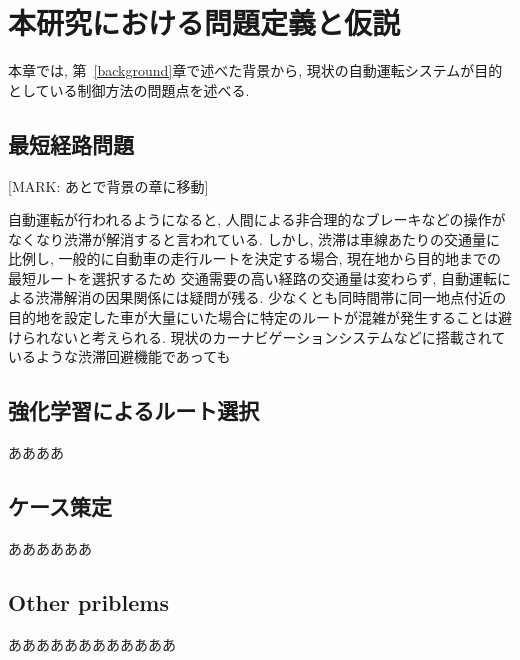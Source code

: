 \chapter{本研究における問題定義と仮説}
\label{issue}

本章では, 第~\ref{background}章で述べた背景から, 現状の自動運転システムが目的としている制御方法の問題点を述べる.

\section{最短経路問題}

[MARK: あとで背景の章に移動]

自動運転が行われるようになると, 人間による非合理的なブレーキなどの操作がなくなり渋滞が解消すると言われている.
しかし, 渋滞は車線あたりの交通量に比例し, 一般的に自動車の走行ルートを決定する場合, 現在地から目的地までの最短ルートを選択するため
交通需要の高い経路の交通量は変わらず, 自動運転による渋滞解消の因果関係には疑問が残る.
少なくとも同時間帯に同一地点付近の目的地を設定した車が大量にいた場合に特定のルートが混雑が発生することは避けられないと考えられる.
現状のカーナビゲーションシステムなどに搭載されているような渋滞回避機能であっても

\section{強化学習によるルート選択}

ああああ


\section{ケース策定}

ああああああ

\section{Other priblems}

ああああああああああああ

